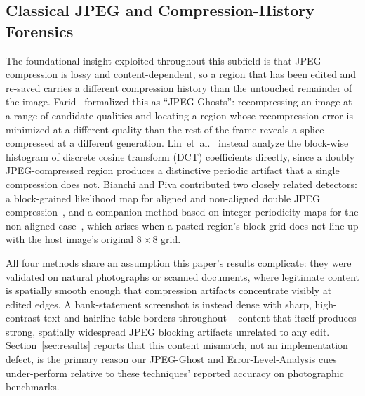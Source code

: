 \documentclass[conference]{IEEEtran}
\begin{document}
\subsection{Classical JPEG and Compression-History Forensics}
The foundational insight exploited throughout this subfield is that JPEG
compression is lossy and content-dependent, so a region that has been edited
and re-saved carries a different compression history than the untouched
remainder of the image. Farid~\cite{farid2009ghosts} formalized this as
``JPEG Ghosts'': recompressing an image at a range of candidate qualities and
locating a region whose recompression error is minimized at a different
quality than the rest of the frame reveals a splice compressed at a different
generation. Lin~et~al.~\cite{lin2009fast} instead analyze the block-wise
histogram of discrete cosine transform (DCT) coefficients directly, since a
doubly JPEG-compressed region produces a distinctive periodic artifact that a
single compression does not. Bianchi and Piva contributed two closely related
detectors: a block-grained likelihood map for aligned and non-aligned double
JPEG compression~\cite{bianchi2012block}, and a companion method based on
integer periodicity maps for the non-aligned case~\cite{bianchi2012nonaligned},
which arises when a pasted region's block grid does not line up with the host
image's original $8\times8$ grid.

All four methods share an assumption this paper's results complicate: they
were validated on natural photographs or scanned documents, where legitimate
content is spatially smooth enough that compression artifacts concentrate
visibly at edited edges. A bank-statement screenshot is instead dense with
sharp, high-contrast text and hairline table borders throughout -- content
that itself produces strong, spatially widespread JPEG blocking artifacts
unrelated to any edit. Section~\ref{sec:results} reports that this content
mismatch, not an implementation defect, is the primary reason our JPEG-Ghost
and Error-Level-Analysis cues under-perform relative to these techniques'
reported accuracy on photographic benchmarks.
\end{document}
